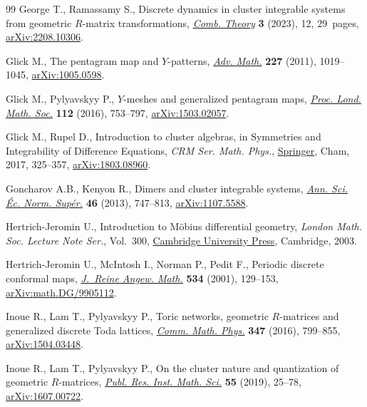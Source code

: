 \begin{thebibliography}{99}
George T., Ramassamy S., Discrete dynamics in cluster integrable systems from
 geometric {$R$}-matrix transformations,
 \href{https://doi.org/10.5070/c63261990}{\textit{Comb. Theory}} \textbf{3}
 (2023), 12, 29~pages,
 \href{http://arxiv.org/abs/2208.10306}{arXiv:2208.10306}.

Glick M., The pentagram map and {$Y$}-patterns,
 \href{https://doi.org/10.1016/j.aim.2011.02.018}{\textit{Adv. Math.}}
 \textbf{227} (2011), 1019--1045,
 \href{http://arxiv.org/abs/1005.0598}{arXiv:1005.0598}.

Glick M., Pylyavskyy P., {$Y$}-meshes and generalized pentagram maps,
 \href{https://doi.org/10.1112/plms/pdw007}{\textit{Proc. Lond. Math. Soc.}}
 \textbf{112} (2016), 753--797,
 \href{http://arxiv.org/abs/1503.02057}{arXiv:1503.02057}.

Glick M., Rupel D., Introduction to cluster algebras, in Symmetries and
 Integrability of Difference Equations, \textit{CRM Ser. Math. Phys.},
 \href{https://doi.org/10.1007/978-3-319-56666-5_7}{Springer}, Cham, 2017,
 325--357, \href{http://arxiv.org/abs/1803.08960}{arXiv:1803.08960}.

Goncharov A.B., Kenyon R., Dimers and cluster integrable systems,
 \href{https://doi.org/10.24033/asens.2201}{\textit{Ann. Sci. \'Ec. Norm.
 Sup\'er.}} \textbf{46} (2013), 747--813,
 \href{http://arxiv.org/abs/1107.5588}{arXiv:1107.5588}.

Hertrich-Jeromin U., Introduction to {M}\"obius differential geometry,
 \textit{London Math. Soc. Lecture Note Ser.}, Vol.~300,
 \href{https://doi.org/10.1017/CBO9780511546693}{Cambridge University Press},
 Cambridge, 2003.

Hertrich-Jeromin U., McIntosh I., Norman P., Pedit F., Periodic discrete
 conformal maps, \href{https://doi.org/10.1515/crll.2001.038}{\textit{J.~Reine
 Angew. Math.}} \textbf{534} (2001), 129--153,
 \href{http://arxiv.org/abs/math.DG/9905112}{arXiv:math.DG/9905112}.

Inoue R., Lam T., Pylyavskyy P., Toric networks, geometric {$R$}-matrices and
 generalized discrete {T}oda lattices,
 \href{https://doi.org/10.1007/s00220-016-2739-z}{\textit{Comm. Math. Phys.}}
 \textbf{347} (2016), 799--855,
 \href{http://arxiv.org/abs/1504.03448}{arXiv:1504.03448}.

Inoue R., Lam T., Pylyavskyy P., On the cluster nature and quantization of
 geometric {$R$}-matrices,
 \href{https://doi.org/10.4171/PRIMS/55-1-2}{\textit{Publ. Res. Inst. Math.
 Sci.}} \textbf{55} (2019), 25--78,
 \href{http://arxiv.org/abs/1607.00722}{arXiv:1607.00722}.


\end{thebibliography}
